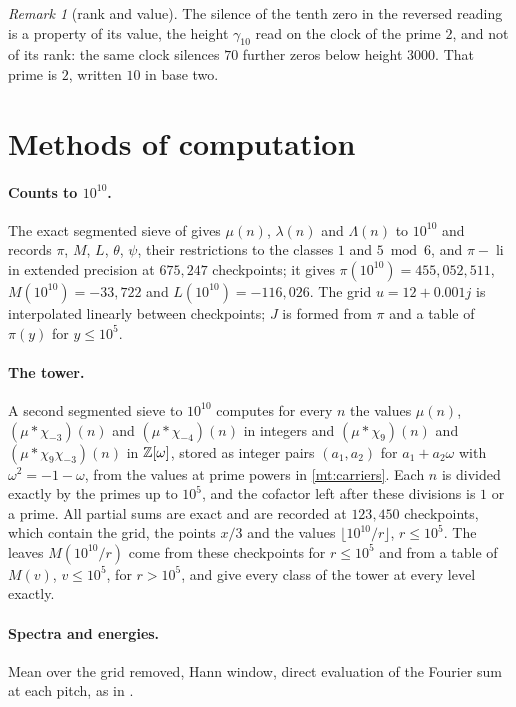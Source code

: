 \documentclass[11pt]{article}
\theoremstyle{definition}\newtheorem{definition}[theorem]{Definition}
\theoremstyle{remark}\newtheorem{remark}[theorem]{Remark}
\theoremstyle{definition}\newtheorem{axiom}{Axiom}
\newcommand{\li}{\operatorname{li}}\newcommand{\Tr}{\operatorname{Tr}}
\begin{document}
\begin{remark}[rank and value]
The silence of the tenth zero in the reversed reading is a property of its value, the height $\gamma_{10}$ read on the clock of the prime $2$, and not of its rank: the same clock silences $70$ further zeros below height $3000$. That prime is $2$, written $10$ in base two.
\end{remark}

\section{Methods of computation}\label{sec:methods}

\paragraph{Counts to $10^{10}$.} The exact segmented sieve of \cite{S10} gives $\mu(n)$, $\lambda(n)$ and $\Lambda(n)$ to $10^{10}$ and records $\pi$, $M$, $L$, $\theta$, $\psi$, their restrictions to the classes $1$ and $5\bmod6$, and $\pi-\li$ in extended precision at $675{,}247$ checkpoints; it gives $\pi(10^{10})=455{,}052{,}511$, $M(10^{10})=-33{,}722$ and $L(10^{10})=-116{,}026$. The grid $u=12+0.001j$ is interpolated linearly between checkpoints; $J$ is formed from $\pi$ and a table of $\pi(y)$ for $y\le10^5$.

\paragraph{The tower.} A second segmented sieve to $10^{10}$ computes for every $n$ the values $\mu(n)$, $(\mu*\chi_{-3})(n)$ and $(\mu*\chi_{-4})(n)$ in integers and $(\mu*\chi_9)(n)$ and $(\mu*\chi_9\chi_{-3})(n)$ in $\mathbb Z[\omega]$, stored as integer pairs $(a_1,a_2)$ for $a_1+a_2\omega$ with $\omega^2=-1-\omega$, from the values at prime powers in \cref{mt:carriers}. Each $n$ is divided exactly by the primes up to $10^5$, and the cofactor left after these divisions is $1$ or a prime. All partial sums are exact and are recorded at $123{,}450$ checkpoints, which contain the grid, the points $x/3$ and the values $\lfloor10^{10}/r\rfloor$, $r\le10^5$. The leaves $M(10^{10}/r)$ come from these checkpoints for $r\le10^5$ and from a table of $M(v)$, $v\le10^5$, for $r>10^5$, and give every class of the tower at every level exactly.

\paragraph{Spectra and energies.} Mean over the grid removed, Hann window, direct evaluation of the Fourier sum at each pitch, as in \cite{S10}.
\end{document}
